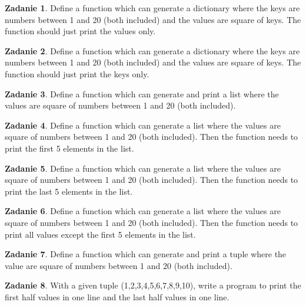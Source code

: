 \documentclass[11pt]{article}
\theoremstyle{definition}
\newtheorem{zadanie}{Zadanie}
\begin{document}
\begin{zadanie}
Define a function which can generate a dictionary where the keys are numbers between 1 and 20 (both included) and the values are square of keys. The function should just print the values only.

\end{zadanie}

\begin{zadanie}
Define a function which can generate a dictionary where the keys are numbers between 1 and 20 (both included) and the values are square of keys. The function should just print the keys only.

\end{zadanie}

\begin{zadanie}
Define a function which can generate and print a list where the values are square of numbers between 1 and 20 (both included).

\end{zadanie}

\begin{zadanie}
Define a function which can generate a list where the values are square of numbers between 1 and 20 (both included). Then the function needs to print the first 5 elements in the list.

\end{zadanie}

\begin{zadanie}
Define a function which can generate a list where the values are square of numbers between 1 and 20 (both included). Then the function needs to print the last 5 elements in the list.

\end{zadanie}

\begin{zadanie}
Define a function which can generate a list where the values are square of numbers between 1 and 20 (both included). Then the function needs to print all values except the first 5 elements in the list.

\end{zadanie}

\begin{zadanie}
Define a function which can generate and print a tuple where the value are square of numbers between 1 and 20 (both included).

\end{zadanie}

\begin{zadanie}
With a given tuple (1,2,3,4,5,6,7,8,9,10), write a program to print the first half values in one line and the last half values in one line.

\end{zadanie}
\end{document}
